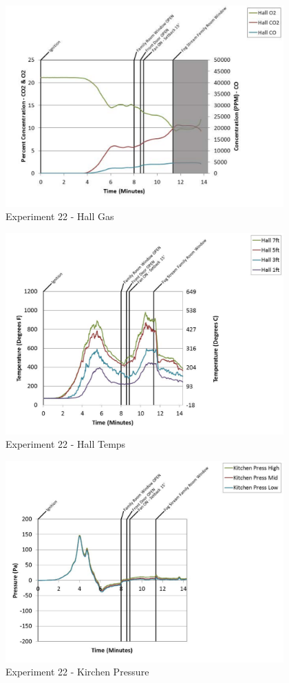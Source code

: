 \documentclass{article}
\begin{document}
\begin{appendices}
	\clearpage

	\begin{figure}[h!]
		\centering
		\includegraphics[height=3.05in]{0_Images/Results_Charts/Exp_22_Charts/HallGas.pdf}
		\caption{Experiment 22 - Hall Gas}
	\end{figure}
 

	\begin{figure}[h!]
		\centering
		\includegraphics[height=3.05in]{0_Images/Results_Charts/Exp_22_Charts/HallTemps.pdf}
		\caption{Experiment 22 - Hall Temps}
	\end{figure}
 
	\clearpage

	\begin{figure}[h!]
		\centering
		\includegraphics[height=3.05in]{0_Images/Results_Charts/Exp_22_Charts/KirchenPressure.pdf}
		\caption{Experiment 22 - Kirchen Pressure}
	\end{figure}
 


\end{appendices}
\end{document}
